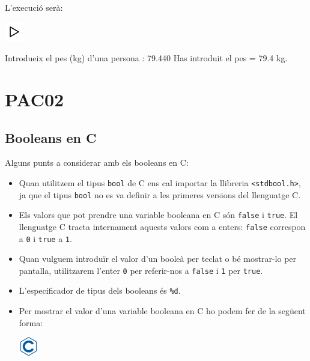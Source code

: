 \documentclass[]{book}
\newenvironment{Shaded}{\begin{snugshade}}{\end{snugshade}}
\newcommand{\FloatTok}[1]{\textcolor[rgb]{0.00,0.00,0.81}{#1}}
\newcommand{\NormalTok}[1]{#1}
\providecommand{\tightlist}{%
  \setlength{\itemsep}{0pt}\setlength{\parskip}{0pt}}
\begin{document}
L'execució serà:

\includegraphics{./img/play.png}

\begin{Shaded}
\begin{Highlighting}[]
\NormalTok{Introdueix el pes (kg) d’una persona : }\FloatTok{79.440}
\NormalTok{Has introduit el pes = }\FloatTok{79.4}\NormalTok{ kg.}
\end{Highlighting}
\end{Shaded}

\hypertarget{pac02}{%
\chapter{PAC02}\label{pac02}}

\hypertarget{booleans}{%
\section{Booleans en C}\label{booleans}}

Alguns punts a considerar amb els booleans en C:

\begin{itemize}
\tightlist
\item
  Quan utilitzem el tipus \texttt{bool} de C ens cal importar la llibreria \texttt{\textless{}stdbool.h\textgreater{}}, ja que el tipus \texttt{bool} no es va definir a les primeres versions del llenguatge C.
\item
  Els valors que pot prendre una variable booleana en C són \texttt{false} i \texttt{true}. El llenguatge C tracta internament aquests valors com a enters: \texttt{false} correspon a \texttt{0} i \texttt{true} a \texttt{1}.
\item
  Quan vulguem introduïr el valor d'un booleà per teclat o bé mostrar-lo per pantalla, utilitzarem l'enter \texttt{0} per referir-nos a \texttt{false} i \texttt{1} per \texttt{true}.
\item
  L'especificador de tipus dels booleans és \texttt{\%d}.
\item
  Per mostrar el valor d'una variable booleana en C ho podem fer de la següent forma:

  \includegraphics{./img/c.png}
\end{itemize}
\end{document}
